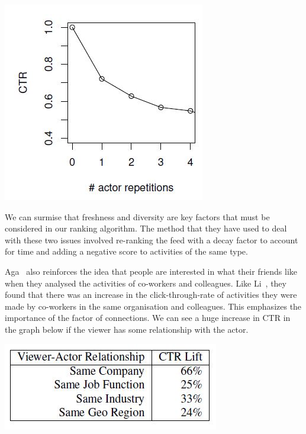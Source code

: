 \begin{center}
\includegraphics[scale=0.8]{images/diversity.jpg}
\end{center}

We can surmise that freshness and diversity are key factors that must be considered in our ranking algorithm. The method that they have used to deal with these two issues involved re-ranking the feed with a decay factor to account for time and adding a negative score to activities of the same type. 

Aga~\cite{Aga2014} also reinforces the idea that people are interested in what their friends like when they analysed the activities of co-workers and colleagues. Like Li~\cite{LiTiaLee2010}, they found that there was an increase in the click-through-rate of activities they were made by co-workers in the same organisation and colleagues. This emphasizes the importance of the factor of connections. We can see a huge increase in CTR in the graph below if the viewer has some relationship with the actor.

\begin{center}
\includegraphics[scale=0.8]{images/connections.jpg}
\end{center}